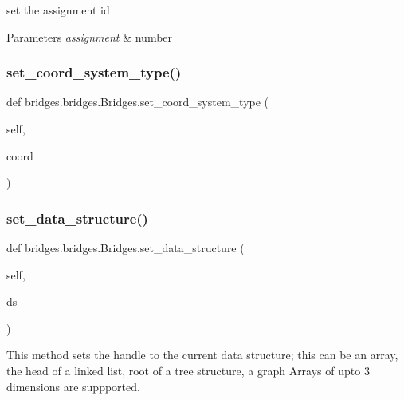 set the assignment id 


\begin{DoxyParams}{Parameters}
{\em assignment} & number \\
\hline
\end{DoxyParams}
\mbox{\label{classbridges_1_1bridges_1_1_bridges_a6bc905490b1995234f88f47af9aa8a17}} 
\subsubsection{\texorpdfstring{set\+\_\+coord\+\_\+system\+\_\+type()}{set\_coord\_system\_type()}}
{\footnotesize\ttfamily def bridges.\+bridges.\+Bridges.\+set\+\_\+coord\+\_\+system\+\_\+type (\begin{DoxyParamCaption}\item[{}]{self,  }\item[{}]{coord }\end{DoxyParamCaption})}

\mbox{\label{classbridges_1_1bridges_1_1_bridges_a868f02fa66c87c1a1fc7bd6fbc799291}} 
\subsubsection{\texorpdfstring{set\+\_\+data\+\_\+structure()}{set\_data\_structure()}}
{\footnotesize\ttfamily def bridges.\+bridges.\+Bridges.\+set\+\_\+data\+\_\+structure (\begin{DoxyParamCaption}\item[{}]{self,  }\item[{}]{ds }\end{DoxyParamCaption})}



This method sets the handle to the current data structure; this can be an array, the head of a linked list, root of a tree structure, a graph Arrays of upto 3 dimensions are suppported. 

